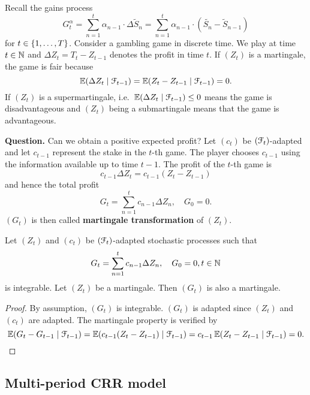 \documentclass[12pt]{amsart}
\begin{document}
\begin{remark}
    Recall the gains process \[
        G_t^\alpha = \sum_{n=1}^t \alpha_{n-1} \cdot \Delta \tilde{S}_n = \sum_{n=1}^t \alpha_{n-1} \cdot (\tilde{S_n}-\tilde{S}_{n-1})
    \]
    for \(t \in \left\{ 1, \dots, T \right\}\). Consider a gambling game in discrete time. We play at time \(t \in \mathbb{N}\) and \(\Delta Z_t = T_t - Z_{t-1}\) denotes the profit in time \(t\). If \((Z_t)\) is a martingale, the game is fair because \[
        \operatorname{\mathbb{E}}(\Delta Z_t \mid \mathcal{F}_{t-1}) = \operatorname{\mathbb{E}}(Z_t - Z_{t-1} \mid \mathcal{F}_{t-1}) = 0.
    \]
    If \((Z_t)\) is a supermartingale, i.e.\ \(\operatorname{\mathbb{E}}(\Delta Z_t \mid \mathcal{F}_{t-1}) \leq 0\) means the game is disadvantageous and \((Z_t)\) being a submartingale means that the game is advantageous.
\end{remark}

\textbf{Question.} Can we obtain a positive expected profit?
Let \((c_t)\) be \((\mathcal{F}_t)\)-adapted and let \(c_{t-1}\) represent the stake in the \(t\)-th game. The player chooses \(c_{t-1}\) using the information available up to time \(t-1\). The profit of the \(t\)-th game is \[
    c_{t-1} \Delta Z_t = c_{t-1} (Z_t-Z_{t-1})
\]
and hence the total profit \[
    G_t = \sum_{n=1}^t c_{n-1} \Delta Z_n , \quad G_0=0.
\]
\((G_t)\) is then called \textbf{martingale transformation} of \((Z_t)\).

\begin{theorem}
    Let \((Z_t)\) and \((c_t)\) be \((\mathcal{F}_t)\)-adapted stochastic processes such that\[
        G_t = \sum_{n=1}^t c_{n-1} \Delta Z_n, \quad G_0=0, t \in \mathbb{N}
    \]
    is integrable. Let \((Z_t)\) be a martingale. Then \((G_t)\) is also a martingale.
\end{theorem}
\begin{proof}
    By assumption, \((G_t)\) is integrable. \((G_t)\) is adapted since \((Z_t)\) and \((c_t)\) are adapted. The martingale property is verified by \[
        \operatorname{\mathbb{E}}(G_t-G_{t-1} \mid \mathcal{F}_{t-1}) = \operatorname{\mathbb{E}}(c_{t-1}(Z_t-Z_{t-1}) \mid \mathcal{F}_{t-1}) = c_{t-1} \operatorname{\mathbb{E}}(Z_t-Z_{t-1}\mid \mathcal{F}_{t-1}) = 0.\qedhere
    \]
\end{proof}

\subsection{Multi-period CRR model}
\end{document}
